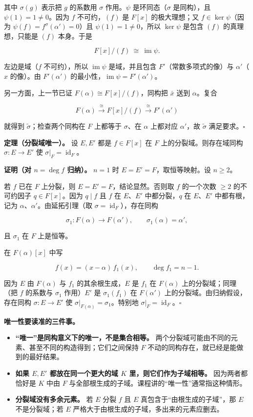 其中 $\sigma(g)$ 表示把 $g$ 的系数用 $\sigma$ 作用。$\psi$ 是环同态（$\sigma$ 是同构），且 $\psi(1)=1\ne0$。因为 $f$ 不可约，$(f)$ 是 $F[x]$ 的极大理想；又 $f\in\ker\psi$（因为 $\psi(f)=f^\sigma(\alpha')=0$）且 $\psi(1)=1\ne0$，所以 $\ker\psi$ 是包含 $(f)$ 的真理想，只能是 $(f)$ 本身。于是

\[
F[x]/(f)\ \cong\ \operatorname{im}\psi .
\]

左边是域（$f$ 不可约），所以 $\operatorname{im}\psi$ 是域，并且包含 $F'$（常数多项式的像）与 $\alpha'$（$x$ 的像）。由 $F'(\alpha')$ 的最小性，$\operatorname{im}\psi=F'(\alpha')$。

另一方面，上一节已证 $F(\alpha)\cong F[x]/(f)$，同构把 $\bar x$ 送到 $\alpha$。复合

\[
F(\alpha)\xrightarrow{\ \cong\ }F[x]/(f)\xrightarrow{\ \cong\ }F'(\alpha')
\]

就得到 $\tilde\sigma$；检查两个同构在 $F$ 上都等于 $\sigma$、在 $\alpha$ 上都对应 $\alpha'$，故 $\tilde\sigma$ 满足要求。$\square$

\textbf{定理（分裂域唯一）。} 设 $E,E'$ 都是 $f\in F[x]$ 在 $F$ 上的分裂域。则存在域同构 $\sigma:E\to E'$ 使 $\sigma|_F=\operatorname{id}_F$。

\textbf{证明（对 $n=\deg f$ 归纳）。} $n=1$ 时 $E=E'=F$，取恒等映射。设 $n\ge2$。

若 $f$ 已在 $F$ 上分裂，则 $E=E'=F$，结论显然。否则取 $f$ 的一个次数 $\ge2$ 的不可约因子 $q\in F[x]$。因为 $q\mid f$ 且 $f$ 在 $E$、$E'$ 中都分裂，$q$ 在 $E$、$E'$ 中都有根，记为 $\alpha$、$\alpha'$。由延拓引理（取 $\sigma=\operatorname{id}_F$），存在同构

\[
\sigma_1:F(\alpha)\longrightarrow F(\alpha'),\qquad \sigma_1(\alpha)=\alpha',
\]

且 $\sigma_1$ 在 $F$ 上是恒等。

在 $F(\alpha)[x]$ 中写

\[
f(x)=(x-\alpha)\,f_1(x),\qquad \deg f_1=n-1.
\]

因为 $E$ 由 $F(\alpha)$ 与 $f_1$ 的其余根生成，$E$ 是 $f_1$ 在 $F(\alpha)$ 上的分裂域；同理（把 $f$ 的系数与 $\sigma_1$ 作用）$E'$ 是 $\sigma_1(f_1)$ 在 $F(\alpha')$ 上的分裂域。由归纳假设，存在同构 $\sigma:E\to E'$ 使 $\sigma|_{F(\alpha)}=\sigma_1$。特别地 $\sigma|_F=\operatorname{id}_F$。$\square$

\textbf{唯一性要读准的三件事。}

\begin{itemize}
\item \textbf{“唯一”是同构意义下的唯一，不是集合相等。} 两个分裂域可能由不同的元素、甚至不同的构造得到；它们之间保持 $F$ 不动的同构存在，就已经是能做到的最好结果。
\item \textbf{如果 $E,E'$ 都放在同一个更大的域 $K$ 里，则它们作为子域相等。} 因为两者都恰好是 $K$ 中由 $F$ 与全部根生成的子域。课程讲的“唯一性”通常指这种情形。
\item \textbf{分裂域没有多余元素。} 若 $E$ 分裂 $f$ 且 $E$ 真包含于“由根生成的子域”，那 $E$ 不是分裂域；若 $E$ 严格大于由根生成的子域，多出来的元素应删去。
\end{itemize}


